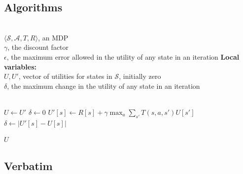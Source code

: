 \documentclass{article}
\begin{document}
\subsection{Algorithms}\label{subsec:algorithms}
\begin{algorithmic}
    \REQUIRE ~\\
             $\langle \mathcal{S}, \mathcal{A}, T, R \rangle$, an MDP\\
             $\gamma$, the discount factor\\
             $\epsilon$, the maximum error allowed in the utility of any state in an iteration
    \STATE \hspace{-1em}\textbf{Local variables:}\\
            $U, U'$, vector of utilities for states in $\mathcal{S}$, initially zero\\
            $\delta$, the maximum change in the utility of any state in an iteration\\
            ~

    \REPEAT
        \STATE $U \leftarrow U'$
        \STATE $\delta \leftarrow 0$
            \STATE $U'[s] \leftarrow R[s] + \gamma \max_a \sum_{s'} T(s,a,s') U[s']$
                \STATE $\delta \leftarrow |U'[s] - U[s]|$
            \ENDIF
        \ENDFOR
    ~

    \RETURN $U$
\end{algorithmic}

\subsection{Verbatim}\label{subsec:verbatim}
\end{document}
